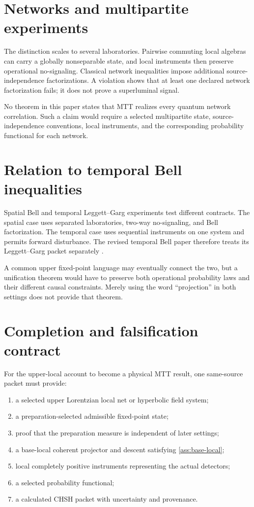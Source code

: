 \documentclass[11pt]{article}
\theoremstyle{remark}
\begin{document}
\section{Networks and multipartite experiments}

The distinction scales to several laboratories.  Pairwise commuting local
algebras can carry a globally nonseparable state, and local instruments then
preserve operational no-signaling.  Classical network inequalities impose
additional source-independence factorizations.  A violation shows that at
least one declared network factorization fails; it does not prove a
superluminal signal.

No theorem in this paper states that MTT realizes every quantum network
correlation.  Such a claim would require a selected multipartite state,
source-independence conventions, local instruments, and the corresponding
probability functional for each network.

\section{Relation to temporal Bell inequalities}

Spatial Bell and temporal Leggett--Garg experiments test different contracts.
The spatial case uses separated laboratories, two-way no-signaling, and Bell
factorization.  The temporal case uses sequential instruments on one system
and permits forward disturbance.  The revised temporal Bell paper therefore
treats its Leggett--Garg packet separately \cite{MTTTemporalBell}.

A common upper fixed-point language may eventually connect the two, but a
unification theorem would have to preserve both operational probability laws
and their different causal constraints.  Merely using the word ``projection''
in both settings does not provide that theorem.

\section{Completion and falsification contract}
\label{sec:completion}

For the upper-local account to become a physical MTT result, one same-source
packet must provide:

\begin{enumerate}[label=(C\arabic*)]
\item a selected upper Lorentzian local net or hyperbolic field system;
\item a preparation-selected admissible fixed-point state;
\item proof that the preparation measure is independent of later settings;
\item a base-local coherent projector and descent satisfying
\cref{ass:base-local};
\item local completely positive instruments representing the actual
detectors;
\item a selected probability functional;
\item a calculated CHSH packet with uncertainty and provenance.
\end{enumerate}
\end{document}
